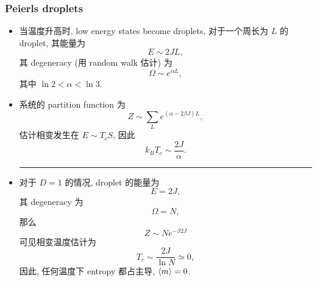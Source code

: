 \subsubsection{Peierls droplets}
\begin{itemize}
	\item 当温度升高时, low energy states become droplets, 对于一个周长为 $L$ 的 droplet, 其能量为
	\begin{equation}
		E \sim 2 J L,
	\end{equation}
	其 degeneracy (用 random walk 估计) 为
	\begin{equation}
		\Omega \sim e^{\alpha L},
	\end{equation}
	其中 $\ln 2 < \alpha < \ln 3$.
	
	\item 系统的 partition function 为
	\begin{equation}
		Z \sim \sum_L e^{(\alpha - 2 \beta J) L},
	\end{equation}
	估计相变发生在 $E \sim T_c S$, 因此
	\begin{equation}
		k_B T_c \sim \frac{2 J}{\alpha}.
	\end{equation}
	
	\noindent\rule[0.5ex]{\linewidth}{0.5pt} %
	
	\item 对于 $D = 1$ 的情况, droplet 的能量为
	\begin{equation}
		E = 2 J,
	\end{equation}
	其 degeneracy 为
	\begin{equation}
		\Omega = N,
	\end{equation}
	那么
	\begin{equation}
		Z \sim N e^{- \beta 2 J}
	\end{equation}
	可见相变温度估计为
	\begin{equation}
		T_c \sim \frac{2 J}{\ln N} \simeq 0,
	\end{equation}
	因此, 任何温度下 entropy 都占主导, $\braket{m} = 0$.
\end{itemize}

